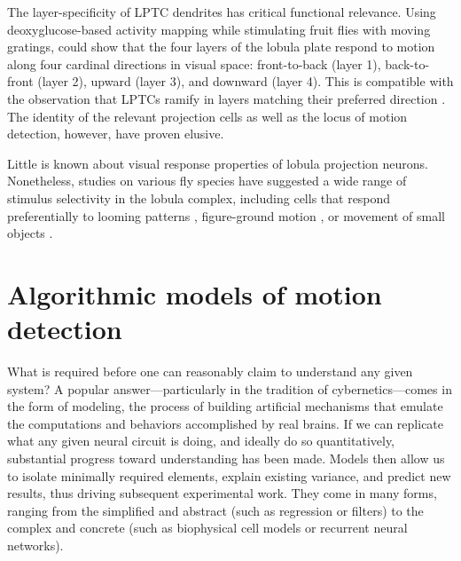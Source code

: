 The layer-specificity of LPTC dendrites has critical functional relevance. Using deoxyglucose-based activity mapping while stimulating fruit flies with moving gratings, \citet{Buchner:1984aa} could show that the four layers of the lobula plate respond to motion along four cardinal directions in visual space: front-to-back (layer 1), back-to-front (layer 2), upward (layer 3), and downward (layer 4). This is compatible with the observation that LPTCs ramify in layers matching their preferred direction \citep{Heisenberg:1978aa,Schnell:2010ik}. The identity of the relevant projection cells as well as the locus of motion detection, however, have proven elusive.

Little is known about visual response properties of lobula projection neurons. Nonetheless, studies on various fly species have suggested a wide range of stimulus selectivity in the lobula complex, including cells that respond preferentially to looming patterns \citep{deVries:2012aa}, figure-ground motion \citep{Egelhaaf:1985aa}, or movement of small objects \citep{Barnett:2007fp}.

\section{Algorithmic models of motion detection}
What is required before one can reasonably claim to understand any given system? A popular answer---particularly in the tradition of cybernetics---comes in the form of modeling, the process of building artificial mechanisms that emulate the computations and behaviors accomplished by real brains. If we can replicate what any given neural circuit is doing, and ideally do so quantitatively, substantial progress toward understanding has been made. Models then allow us to isolate minimally required elements, explain existing variance, and predict new results, thus driving subsequent experimental work. They come in many forms, ranging from the simplified and abstract (such as regression or filters) to the complex and concrete (such as biophysical cell models or recurrent neural networks).

